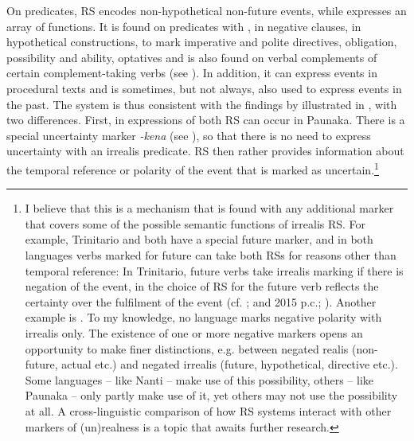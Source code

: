 On predicates,  RS encodes non-hypothetical non-future events, while  expresses an array of functions. It is found on predicates with , in negative clauses, in hypothetical constructions, to mark imperative and polite directives, obligation, possibility and ability, optatives and is also found on verbal complements of certain complement-taking verbs (see ). In addition, it can express  events in procedural texts and is sometimes, but not always, also used to express  events in the past. The system is thus consistent with the findings by \citet[]{Michael2014,Michael2014a} illustrated in , with two differences. First, in expressions of  both RS can occur in Paunaka. There is a special uncertainty marker \textit{-kena} (see ), so that there is no need to express uncertainty with an irrealis predicate. RS then rather provides information about the temporal reference or polarity of the event that is marked as uncertain.\footnote{I believe that this is a mechanism that is found with any additional marker that covers some of the possible semantic functions of irrealis RS. For example, Trinitario and  both have a special future marker, and in both languages verbs marked for future can take both RSs for reasons other than temporal reference: In Trinitario, future verbs take irrealis marking if there is negation of the event, in  the choice of RS for the future verb reflects the certainty over the fulfilment of the event (cf. \citealt[262]{EkdahlGrimes1964}; \citealt[228--229]{Rose2014} and 2015 p.c.; \citealt{DanielsenTerhartSubm}). Another example is . To my knowledge, no language marks negative polarity with irrealis only. The existence of one or more negative markers opens an opportunity to make finer distinctions, e.g. between negated realis (non-future, actual etc.) and negated irrealis (future, hypothetical, directive etc.). Some languages -- like Nanti -- make use of this possibility, others -- like Paunaka --  only partly make use of it, yet others may not use the possibility at all. A cross-linguistic comparison of how RS systems interact with other markers of (un)realness is a topic that awaits further research.\label{ftn:irrealis}}%
 
